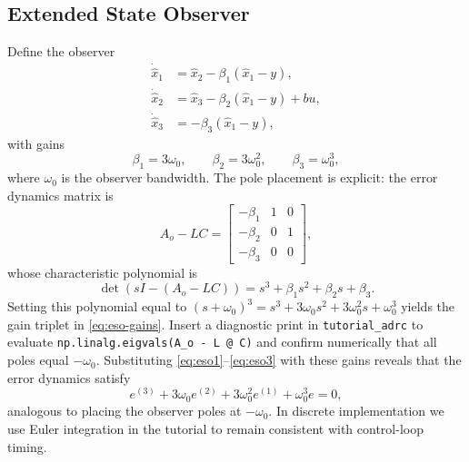 \subsection{Extended State Observer}
Define the observer
\begin{align}
    \dot{\hat{x}}_1 &= \hat{x}_2 - \beta_1 (\hat{x}_1 - y), \label{eq:eso1}\\
    \dot{\hat{x}}_2 &= \hat{x}_3 - \beta_2 (\hat{x}_1 - y) + b u, \label{eq:eso2}\\
    \dot{\hat{x}}_3 &= -\beta_3 (\hat{x}_1 - y), \label{eq:eso3}
\end{align}
with gains
\begin{equation}
    \beta_1 = 3 \omega_0, \qquad \beta_2 = 3 \omega_0^2, \qquad \beta_3 = \omega_0^3,
    \label{eq:eso-gains}
\end{equation}
where $\omega_0$ is the observer bandwidth. The pole placement is explicit: the error dynamics matrix is
\[
    A_o - L C =
    \begin{bmatrix}
        -\beta_1 & 1 & 0 \\
        -\beta_2 & 0 & 1 \\
        -\beta_3 & 0 & 0
    \end{bmatrix},
\]
whose characteristic polynomial is
\[
    \det(s I - (A_o - L C)) = s^3 + \beta_1 s^2 + \beta_2 s + \beta_3.
\]
Setting this polynomial equal to $(s + \omega_0)^3 = s^3 + 3 \omega_0 s^2 + 3 \omega_0^2 s + \omega_0^3$ yields the gain triplet in \eqref{eq:eso-gains}. Insert a diagnostic print in \texttt{tutorial\_adrc} to evaluate \texttt{np.linalg.eigvals(A\_o - L @ C)} and confirm numerically that all poles equal $-\omega_0$. Substituting \eqref{eq:eso1}--\eqref{eq:eso3} with these gains reveals that the error dynamics satisfy
\begin{equation}
    e^{(3)} + 3 \omega_0 e^{(2)} + 3 \omega_0^2 e^{(1)} + \omega_0^3 e = 0,
\end{equation}
analogous to placing the observer poles at $-\omega_0$. In discrete implementation we use Euler integration in the tutorial to remain consistent with control-loop timing.

